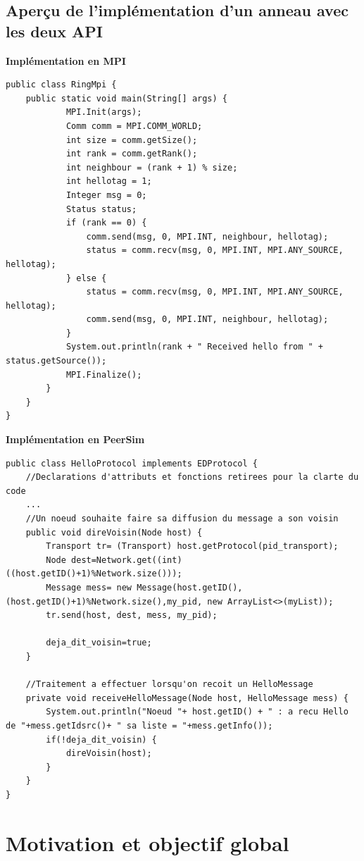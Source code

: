 \documentclass{article}
\begin{document}
			\newpage
			\subsection{Aperçu de l'implémentation d'un anneau avec les deux API}
				{\bfseries Implémentation en MPI}
				\begin{lstlisting}
public class RingMpi {
	public static void main(String[] args) {
			MPI.Init(args);
			Comm comm = MPI.COMM_WORLD;
			int size = comm.getSize();
			int rank = comm.getRank();
			int neighbour = (rank + 1) % size;
			int hellotag = 1;
			Integer msg = 0;
			Status status;
			if (rank == 0) {
				comm.send(msg, 0, MPI.INT, neighbour, hellotag);
				status = comm.recv(msg, 0, MPI.INT, MPI.ANY_SOURCE, hellotag);
			} else {
				status = comm.recv(msg, 0, MPI.INT, MPI.ANY_SOURCE, hellotag);
				comm.send(msg, 0, MPI.INT, neighbour, hellotag);
			}
			System.out.println(rank + " Received hello from " + status.getSource());
			MPI.Finalize();
		}
	}
}
				\end{lstlisting}
				{\bfseries Implémentation en PeerSim}
				\begin{lstlisting}
public class HelloProtocol implements EDProtocol {
	//Declarations d'attributs et fonctions retirees pour la clarte du code
	...
	//Un noeud souhaite faire sa diffusion du message a son voisin
	public void direVoisin(Node host) {
		Transport tr= (Transport) host.getProtocol(pid_transport);
		Node dest=Network.get((int) ((host.getID()+1)%Network.size()));
		Message mess= new Message(host.getID(),(host.getID()+1)%Network.size(),my_pid, new ArrayList<>(myList));
		tr.send(host, dest, mess, my_pid);

		deja_dit_voisin=true;
	}

	//Traitement a effectuer lorsqu'on recoit un HelloMessage
	private void receiveHelloMessage(Node host, HelloMessage mess) {
		System.out.println("Noeud "+ host.getID() + " : a recu Hello de "+mess.getIdsrc()+ " sa liste = "+mess.getInfo());
		if(!deja_dit_voisin) {
			direVoisin(host);
		}
	}
}
				\end{lstlisting}
		\section{Motivation et objectif global}
\end{document}

